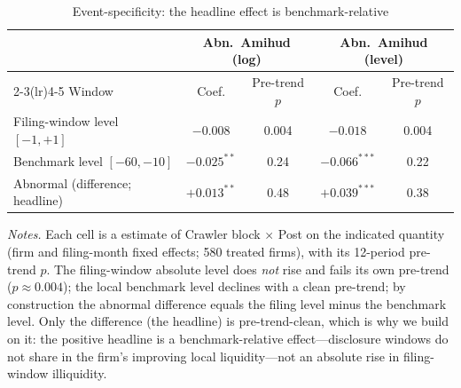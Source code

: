 \begin{table}[t]
\centering
\begin{threeparttable}
\caption{Event-specificity: the headline effect is benchmark-relative}
\label{tab:eventspec}
\small
\begin{tabular}{lcccc}
\toprule
 & \multicolumn{2}{c}{Abn.\ Amihud (log)} & \multicolumn{2}{c}{Abn.\ Amihud (level)} \\
\cmidrule(lr){2-3}\cmidrule(lr){4-5}
Window & Coef. & Pre-trend $p$ & Coef. & Pre-trend $p$ \\
\midrule
Filing-window level $[-1,+1]$    & $-0.008$        & 0.004 & $-0.018$        & 0.004 \\
Benchmark level $[-60,-10]$      & $-0.025^{**}$   & 0.24  & $-0.066^{***}$  & 0.22  \\
Abnormal (difference; headline)  & $+0.013^{**}$   & 0.48  & $+0.039^{***}$  & 0.38  \\
\bottomrule
\end{tabular}
\begin{tablenotes}\footnotesize
\item \textit{Notes.} Each cell is a \citet{BorusyakJaravelSpiess2024} estimate of Crawler block $\times$ Post on the indicated quantity (firm and filing-month fixed effects; 580 treated firms), with its 12-period pre-trend $p$. The filing-window absolute level does \emph{not} rise and fails its own pre-trend ($p\approx0.004$); the local benchmark level declines with a clean pre-trend; by construction the abnormal difference equals the filing level minus the benchmark level. Only the difference (the headline) is pre-trend-clean, which is why we build on it: the positive headline is a benchmark-relative effect---disclosure windows do not share in the firm's improving local liquidity---not an absolute rise in filing-window illiquidity.
\end{tablenotes}
\end{threeparttable}
\end{table}
